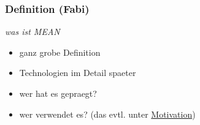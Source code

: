 \subsubsection{Definition (Fabi)}\label{definition-fabi}

\emph{was ist MEAN}

\begin{itemize}
\itemsep1pt\parskip0pt
\item
  ganz grobe Definition
\item
  Technologien im Detail spaeter
\item
  wer hat es gepraegt?
\item
  wer verwendet es? (das evtl. unter \hyperref[motivation]{Motivation})
\end{itemize}

